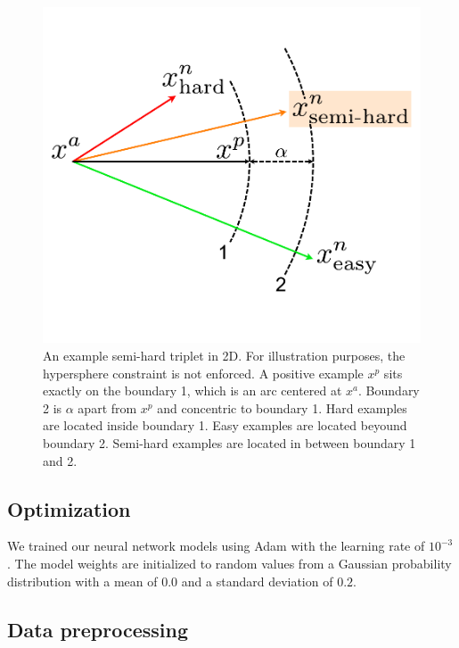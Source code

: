 \begin{figure} 
\includegraphics[width=1.0\textwidth,keepaspectratio]
{./figures/triplet_difficulty_level.pdf} 

\caption{An example semi-hard triplet in 2D.  For illustration purposes, the
hypersphere constraint is not enforced.  A positive example $x^p$ sits exactly
on the boundary 1, which is an arc centered at $x^a$. Boundary 2 is $\alpha$
apart from $x^p$ and concentric to boundary 1.  Hard examples are located inside
boundary 1.  Easy examples are located beyound boundary 2. Semi-hard examples
are located in between boundary 1 and 2.  } 

\label{fig: semi-hard} 
\end{figure}


\subsection{Optimization}


We trained our neural network models using Adam
\cite{kingmaAdamMethodStochastic2017} with the learning rate of $10^{-3}$.  The
model weights are initialized to random values from a Gaussian probability
distribution with a mean of $0.0$ and a standard deviation of $0.2$.  

\subsection{Data preprocessing}

